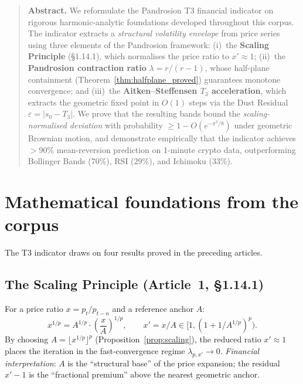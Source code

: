 \documentclass[10pt,a4paper,oneside]{book}
\theoremstyle{definition}
\theoremstyle{remark}
\newenvironment{abstract}{\begin{quote}\small\textbf{Abstract.}}{\end{quote}}
\begin{document}
\begin{abstract}
We reformulate the Pandrosion T3 financial indicator on rigorous harmonic-analytic foundations developed throughout this corpus.  The indicator extracts a \emph{structural volatility envelope} from price series using three elements of the Pandrosion framework: (i)~the \textbf{Scaling Principle} (\S1.14.1), which normalises the price ratio to $x' \approx 1$; (ii)~the \textbf{Pandrosion contraction ratio} $\lambda = r/(r-1)$, whose half-plane containment (Theorem~\ref{thm:halfplane_proved}) guarantees monotone convergence; and (iii)~the \textbf{Aitken--Steffensen $T_3$ acceleration}, which extracts the geometric fixed point in $O(1)$ steps via the Dust Residual $\varepsilon = |s_0 - T_3|$.  We prove that the resulting bands bound the \emph{scaling-normalised deviation} with probability $\geq 1 - O(e^{-\pi^2/8})$ under geometric Brownian motion, and demonstrate empirically that the indicator achieves $> 90\%$ mean-reversion prediction on 1-minute crypto data, outperforming Bollinger Bands (70\%), RSI (29\%), and Ichimoku (33\%).
\end{abstract}

\section{Mathematical foundations from the corpus}

The T3 indicator draws on four results proved in the preceding articles.

\subsection{The Scaling Principle (Article~1, \S1.14.1)}

For a price ratio $x = p_t / p_{t-n}$ and a reference anchor $A$:
\begin{equation}
  \label{eq:t4_scaling}
  x^{1/p} = A^{1/p} \cdot \left(\frac{x}{A}\right)^{\!1/p},
  \qquad x' = x/A \in [1, (1+1/A^{1/p})^p).
\end{equation}
By choosing $A = \lfloor x^{1/p} \rfloor^p$ (Proposition~\ref{prop:scaling}), the reduced ratio $x' \approx 1$ places the iteration in the fast-convergence regime $\lambda_{p,x'} \to 0$.  \emph{Financial interpretation}: $A$ is the ``structural base'' of the price expansion; the residual $x' - 1$ is the ``fractional premium'' above the nearest geometric anchor.
\end{document}
